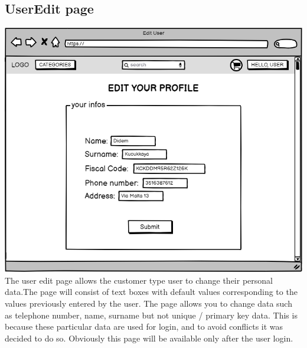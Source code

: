 \subsection{UserEdit page}
    \includegraphics[width=\textwidth,height=\textheight,keepaspectratio]{mockups/userEditPageMockup.png}
\\
The user edit page allows the customer type user to change their personal data.The page will consist of text boxes with default values corresponding to the values previously entered by the user. The page allows you to change data such as telephone number, name, surname but not unique / primary key data. This is because these particular data are used for login, and to avoid conflicts it was decided to do so.
Obviously this page will be available only after the user login.

